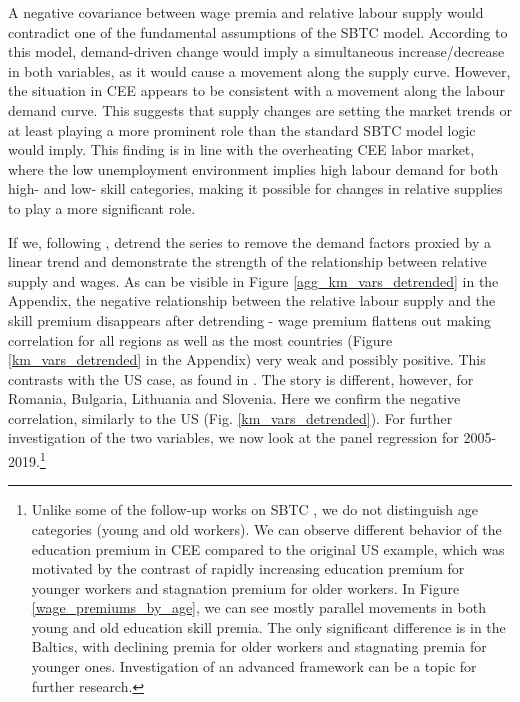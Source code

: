 \documentclass[11pt]{article}
\begin{document}
A negative covariance between wage premia and relative labour supply would contradict one of the fundamental assumptions of the SBTC model. According to this model, demand-driven change would imply a simultaneous increase/decrease in both variables, as it would cause a movement along the supply curve. However, the situation in CEE appears to be consistent with a movement along the labour demand curve. This suggests that supply changes are setting the market trends or at least playing a more prominent role than the standard SBTC model logic would imply. This finding is in line with the overheating  CEE labor market, where the low unemployment environment implies high labour demand for both high- and low- skill categories, making it possible for changes in relative supplies to play a more significant role. %


If we, following \citet{acemoglu2012does}, detrend the series to remove the demand factors proxied by a linear trend and demonstrate the strength of the relationship between relative supply and wages. As can be visible in Figure \ref{agg_km_vars_detrended} in the Appendix, the negative relationship between the relative labour supply and the skill premium disappears after detrending - wage premium flattens out making correlation for all regions as well as the most countries (Figure \ref{km_vars_detrended} in the Appendix) very weak and possibly positive. This contrasts with the US case, as found in \citet{acemoglu2012does}. The story is different, however, for Romania, Bulgaria, Lithuania and Slovenia. Here we confirm the negative correlation, similarly to the US (Fig. \ref{km_vars_detrended}).
For further investigation of the two variables, we now look at the panel regression for 2005-2019.\footnote{Unlike some of the follow-up works on SBTC \citep{card2001can}, we do not distinguish age categories (young and old workers). We can observe different behavior of the education premium in CEE compared to the original US example, which was motivated by the contrast of rapidly increasing education premium for younger workers and stagnation premium for older workers. In Figure \ref{wage_premiums_by_age}, we can see mostly parallel movements in both young and old education skill premia. The only significant difference is in the Baltics, with declining premia for older workers and stagnating premia for younger ones. Investigation of an advanced framework can be a topic for further research.}   %
\end{document}
